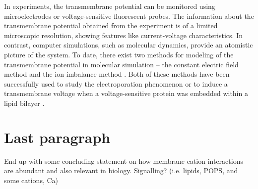 In experiments, the transmembrane potential can be monitored using microelectrodes \cite{Sakmann1976,Grinvald1987} or voltage-sensitive fluorescent probes. \cite{Han2014,Akemann2010,Perron2009a,Mutoh2009,Barnett2012,Wooltorton2012,Akemann2009,Fisher2008,Obaid2004}  
The information about the transmembrane potential obtained from the experiment is of a limited microscopic resolution, showing features like current-voltage characteristics. 
In contrast, computer simulations, such as molecular dynamics, provide an atomistic picture of the system. 
To date, there exist two methods for modeling of the transmembrane potential in molecular simulation -- the constant electric field method \cite{roux_influence_1997, tieleman_voltage-dependent_2001, roux_membrane_2008, gumbart_constant_2012, sin_asymmetric_2015} and the ion imbalance method 
\cite{sachs_changes_2004, delemotte_modeling_2008}. 
Both of these methods have been successfully used to study the electroporation phenomenon or to induce a transmembrane voltage when a voltage-sensitive protein was embedded within a lipid bilayer 
\cite{Vargas2012, bockmann_kinetics_2008, gumbart_constant_2012, kutzner_computational_2011, casciola_molecular_2014}. 

\section{Last paragraph}
 End up with some concluding statement on how membrane cation interactions are abundant and also relevant in biology.
 Signalling? (i.e. lipids, POPS, and some cations, Ca)


